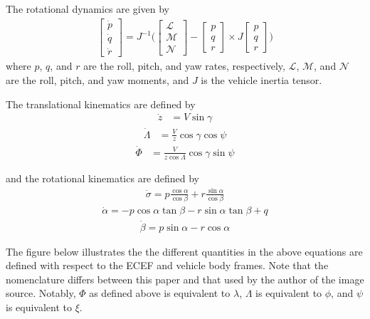 \documentclass[12pt]{article}
\numberwithin{equation}{section}
\numberwithin{figure}{section}
\numberwithin{table}{section}
\begin{document}
The rotational dynamics are given by
\begin{align}
  \begin{bmatrix}
    \dot{p} \\
    \dot{q} \\
    \dot{r}
  \end{bmatrix} = J^{-1} \Biggl(\begin{bmatrix}
     \mathcal{L}\\
     \mathcal{M}\\
     \mathcal{N}
    \end{bmatrix}
    - \begin{bmatrix}
      p \\
      q \\
      r
    \end{bmatrix}
    \times J\begin{bmatrix}
      p \\
      q \\
      r
\end{bmatrix}
\Biggl)
\end{align}
where $p$, $q$, and $r$ are the roll, pitch, and yaw rates, respectively, $\mathcal{L}$, $\mathcal{M}$, and $\mathcal{N}$ are the roll, pitch, and yaw moments, and $J$ is the vehicle inertia tensor.

The translational kinematics are defined by
\begin{align}
  \dot{z} &= V\sin\gamma
\end{align}
\begin{align}
  \dot{\Lambda} &= \frac{V}{z}\cos\gamma\cos\psi
\end{align}
\begin{align}
\dot{\Phi} &= \frac{V}{z\cos\Lambda}\cos\gamma\sin\psi
\end{align}

and the rotational kinematics are defined by
\begin{align}
\dot{\sigma} = p\frac{\cos\alpha}{ \cos\beta} + r \frac{\sin\alpha}{\cos\beta}
\end{align}
\begin{align}
  \dot{\alpha} = -p\cos\alpha\tan\beta - r\sin\alpha\tan\beta + q
\end{align}
\begin{align}
\dot{\beta} = p\sin\alpha - r\cos\alpha
\end{align}

The figure below illustrates the the different quantities in the above equations are defined with respect to the ECEF and vehicle body frames. Note that the nomenclature differs between this paper and that used by the author of the image source. Notably, $\Phi$ as defined above is equivalent to $\lambda$, $\Lambda$ is equivalent to $\phi$, and $\psi$ is equivalent to $\xi$.
\end{document}
